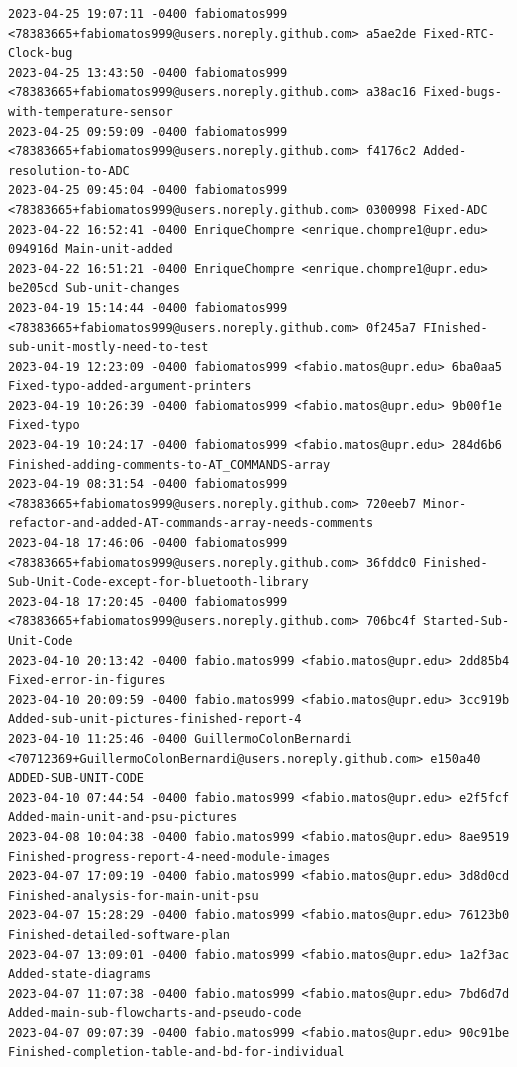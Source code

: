 \documentclass[12pt]{article}
\begin{document}
\begin{lstlisting}
2023-04-25 19:07:11 -0400 fabiomatos999 <78383665+fabiomatos999@users.noreply.github.com> a5ae2de Fixed-RTC-Clock-bug
2023-04-25 13:43:50 -0400 fabiomatos999 <78383665+fabiomatos999@users.noreply.github.com> a38ac16 Fixed-bugs-with-temperature-sensor
2023-04-25 09:59:09 -0400 fabiomatos999 <78383665+fabiomatos999@users.noreply.github.com> f4176c2 Added-resolution-to-ADC
2023-04-25 09:45:04 -0400 fabiomatos999 <78383665+fabiomatos999@users.noreply.github.com> 0300998 Fixed-ADC
2023-04-22 16:52:41 -0400 EnriqueChompre <enrique.chompre1@upr.edu> 094916d Main-unit-added
2023-04-22 16:51:21 -0400 EnriqueChompre <enrique.chompre1@upr.edu> be205cd Sub-unit-changes
2023-04-19 15:14:44 -0400 fabiomatos999 <78383665+fabiomatos999@users.noreply.github.com> 0f245a7 FInished-sub-unit-mostly-need-to-test
2023-04-19 12:23:09 -0400 fabiomatos999 <fabio.matos@upr.edu> 6ba0aa5 Fixed-typo-added-argument-printers
2023-04-19 10:26:39 -0400 fabiomatos999 <fabio.matos@upr.edu> 9b00f1e Fixed-typo
2023-04-19 10:24:17 -0400 fabiomatos999 <fabio.matos@upr.edu> 284d6b6 Finished-adding-comments-to-AT_COMMANDS-array
2023-04-19 08:31:54 -0400 fabiomatos999 <78383665+fabiomatos999@users.noreply.github.com> 720eeb7 Minor-refactor-and-added-AT-commands-array-needs-comments
2023-04-18 17:46:06 -0400 fabiomatos999 <78383665+fabiomatos999@users.noreply.github.com> 36fddc0 Finished-Sub-Unit-Code-except-for-bluetooth-library
2023-04-18 17:20:45 -0400 fabiomatos999 <78383665+fabiomatos999@users.noreply.github.com> 706bc4f Started-Sub-Unit-Code
2023-04-10 20:13:42 -0400 fabio.matos999 <fabio.matos@upr.edu> 2dd85b4 Fixed-error-in-figures
2023-04-10 20:09:59 -0400 fabio.matos999 <fabio.matos@upr.edu> 3cc919b Added-sub-unit-pictures-finished-report-4
2023-04-10 11:25:46 -0400 GuillermoColonBernardi <70712369+GuillermoColonBernardi@users.noreply.github.com> e150a40 ADDED-SUB-UNIT-CODE
2023-04-10 07:44:54 -0400 fabio.matos999 <fabio.matos@upr.edu> e2f5fcf Added-main-unit-and-psu-pictures
2023-04-08 10:04:38 -0400 fabio.matos999 <fabio.matos@upr.edu> 8ae9519 Finished-progress-report-4-need-module-images
2023-04-07 17:09:19 -0400 fabio.matos999 <fabio.matos@upr.edu> 3d8d0cd Finished-analysis-for-main-unit-psu
2023-04-07 15:28:29 -0400 fabio.matos999 <fabio.matos@upr.edu> 76123b0 Finished-detailed-software-plan
2023-04-07 13:09:01 -0400 fabio.matos999 <fabio.matos@upr.edu> 1a2f3ac Added-state-diagrams
2023-04-07 11:07:38 -0400 fabio.matos999 <fabio.matos@upr.edu> 7bd6d7d Added-main-sub-flowcharts-and-pseudo-code
2023-04-07 09:07:39 -0400 fabio.matos999 <fabio.matos@upr.edu> 90c91be Finished-completion-table-and-bd-for-individual

\end{lstlisting}
\end{document}
